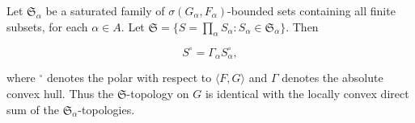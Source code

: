 Let $\mathfrak{S}_\alpha$ be a saturated family of $\sigma(G_\alpha, F_\alpha)$-bounded sets containing all finite subsets, for each $\alpha \in A$. Let $\mathfrak{S} = \{S = \prod_\alpha S_\alpha : S_\alpha \in \mathfrak{S}_\alpha\}$. Then

$$S^\circ = \Gamma_\alpha S_\alpha^\circ,$$

where $^\circ$ denotes the polar with respect to $\langle F, G \rangle$ and $\Gamma$ denotes the absolute convex hull. Thus the $\mathfrak{S}$-topology on $G$ is identical with the locally convex direct sum of the $\mathfrak{S}_\alpha$-topologies.
